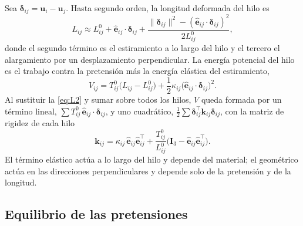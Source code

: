 \documentclass[fleqn,final]{jaes}
\begin{document}
Sea $\boldsymbol{\delta}_{ij}=\mathbf{u}_i-\mathbf{u}_j$. Hasta segundo
orden, la longitud deformada del hilo es
\begin{equation}
  L_{ij}\approx L^0_{ij}+\hat{\mathbf{e}}_{ij}\cdot\boldsymbol{\delta}_{ij}
  +\frac{\lVert\boldsymbol{\delta}_{ij}\rVert^2
  -(\hat{\mathbf{e}}_{ij}\cdot\boldsymbol{\delta}_{ij})^2}{2L^0_{ij}}, %
  \label{eq:L2}
\end{equation}
donde el segundo término es el estiramiento a lo largo del hilo y el
tercero el alargamiento por un desplazamiento perpendicular. La energía
potencial del hilo es el trabajo contra la pretensión más la energía
elástica del estiramiento,
\begin{equation}
  V_{ij}=T^0_{ij}\bigl(L_{ij}-L^0_{ij}\bigr)
  +\frac12\kappa_{ij}\bigl(\hat{\mathbf{e}}_{ij}\cdot
  \boldsymbol{\delta}_{ij}\bigr)^2 . %
  \label{eq:Vhilo}
\end{equation}
Al sustituir la \cref{eq:L2} y sumar sobre todos los hilos, $V$ queda
formada por un término lineal,
$\sum T^0_{ij}\,\hat{\mathbf{e}}_{ij}\cdot\boldsymbol{\delta}_{ij}$, y uno
cuadrático,
$\frac12\sum\boldsymbol{\delta}_{ij}^{\top}\mathbf{k}_{ij}\boldsymbol{\delta}_{ij}$,
con la matriz de rigidez de cada hilo
\begin{equation}
  \mathbf{k}_{ij}=
  \kappa_{ij}\,\hat{\mathbf{e}}_{ij}\hat{\mathbf{e}}_{ij}^{\top}
  +\frac{T^0_{ij}}{L^0_{ij}}\bigl(\mathbf{I}_3
  -\hat{\mathbf{e}}_{ij}\hat{\mathbf{e}}_{ij}^{\top}\bigr).
  \label{eq:ke}
\end{equation}
El término elástico actúa a lo largo del hilo y depende del material; el geométrico actúa en las direcciones perpendiculares y depende solo de la pretensión y de la longitud.

\subsection{Equilibrio de las pretensiones}\label{sec:equilibrio}
\end{document}
